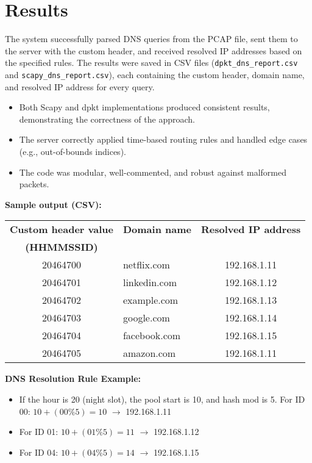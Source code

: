 \documentclass[10pt,a4paper]{report}
\begin{document}
\section{Results}

The system successfully parsed DNS queries from the PCAP file, sent them to the server with the custom header, and received resolved IP addresses based on the specified rules. The results were saved in CSV files (\texttt{dpkt\_dns\_report.csv} and \texttt{scapy\_dns\_report.csv}), each containing the custom header, domain name, and resolved IP address for every query.

\begin{itemize}
    \item Both Scapy and dpkt implementations produced consistent results, demonstrating the correctness of the approach.
    \item The server correctly applied time-based routing rules and handled edge cases (e.g., out-of-bounds indices).
    \item The code was modular, well-commented, and robust against malformed packets.
\end{itemize}


\textbf{Sample output (CSV):}
\begin{center}
\begin{tabular}{|c|l|c|}
\hline
\textbf{Custom header value} & \textbf{Domain name} & \textbf{Resolved IP address} \\
\textbf{(HHMMSSID)} & & \\
\hline
20464700 & netflix.com & 192.168.1.11 \\
20464701 & linkedin.com & 192.168.1.12 \\
20464702 & example.com & 192.168.1.13 \\
20464703 & google.com & 192.168.1.14 \\
20464704 & facebook.com & 192.168.1.15 \\
20464705 & amazon.com & 192.168.1.11 \\
\hline
\end{tabular}
\end{center}

\textbf{DNS Resolution Rule Example:}
\begin{itemize}
    \item If the hour is 20 (night slot), the pool start is 10, and hash mod is 5. For ID 00: $10 + (00 \% 5) = 10$ $\rightarrow$ 192.168.1.11
    \item For ID 01: $10 + (01 \% 5) = 11$ $\rightarrow$ 192.168.1.12
    \item For ID 04: $10 + (04 \% 5) = 14$ $\rightarrow$ 192.168.1.15
    \newline
    \newline
\end{itemize}
\end{document}
